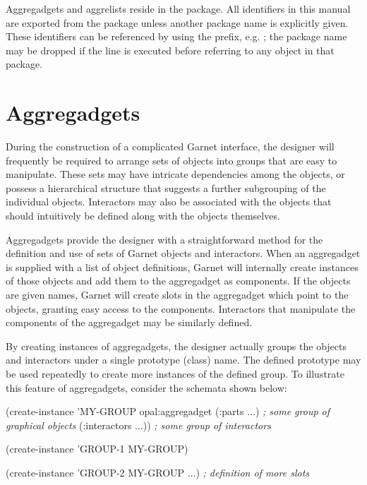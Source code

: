 Aggregadgets and aggrelists reside in the  package.
All identifiers in this manual are exported from the  package unless
another package name is explicitly given.  These identifiers can be
referenced by using the  prefix, e.g. ;
the package name may be dropped if the line
is executed before referring to any object in that package.

\section{Aggregadgets}

During the construction of a complicated Garnet interface, the designer will
frequently be required to arrange sets of objects into groups
that are easy to manipulate.  These sets may have intricate dependencies among
the objects, or possess a hierarchical structure that suggests a further
subgrouping of the individual objects.  Interactors may also be associated with
the objects that should intuitively be defined along with the objects
themselves.

Aggregadgets provide the designer with a straightforward method for the
definition and use of sets of Garnet objects and interactors.  When an
aggregadget is supplied
with a list of object definitions, Garnet will internally create instances
of those objects and add them to the aggregadget as components.  If the
objects are given names, Garnet will create slots in the aggregadget
which point to the objects, granting easy access to the components.
Interactors that manipulate the components of
the aggregadget may be similarly defined.

By creating instances of aggregadgets, the designer actually groups the
objects and interactors under a single prototype (class) name.  The defined
prototype may be used repeatedly to create more instances of the defined
group.  To illustrate this feature of aggregadgets, consider the schemata
shown below:
\begin{programexample}
(create-instance 'MY-GROUP opal:aggregadget
   (:parts
           ...)       {\it ; some group of graphical objects}
   (:interactors
           ...))      {\it ; some group of interactors}

(create-instance 'GROUP-1 MY-GROUP)

(create-instance 'GROUP-2 MY-GROUP
   ...)               {\it ; definition of more slots}
\end{programexample}

